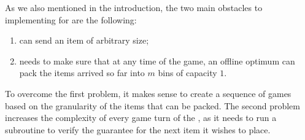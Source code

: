 As we also mentioned in the introduction, the two main obstacles to
implementing \minimax for \binstretch are the following:

\begin{enumerate}
\item \adversary can send an item of arbitrary  size;
\item \adversary needs to make sure that at any time of the game, an offline
  optimum can pack the items arrived so far into $m$ bins of capacity $1$.
\end{enumerate}

To overcome the first problem, it makes sense to create a sequence of
games based on the granularity of the items that can be packed.  The
second problem increases the complexity of every game turn of the
\adversary, as it needs to run a subroutine to verify the guarantee
for the next item it wishes to place.

